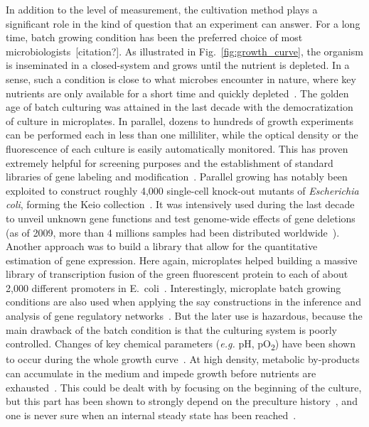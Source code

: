 In addition to the level of measurement, the cultivation method plays a significant role in the kind of question that an experiment can answer.
For a long time, batch growing condition has been the preferred choice of most microbiologists~[citation?].
As illustrated in Fig.~\ref{fig:growth_curve}, the organism is inseminated in a closed-system and grows until the nutrient is depleted.
In a sense, such a condition is close to what microbes encounter in nature, where key nutrients are only available for a short time and quickly depleted~\cite{mcarthur_microbial_2006,menge_nitrogen_2012,hobbie_microbes_2013}.
The golden age of batch culturing was attained in the last decade with the democratization of culture in microplates.
In parallel, dozens to hundreds of growth experiments can be performed each in less than one milliliter, while the optical density or the fluorescence of each culture is easily automatically monitored.
This has proven extremely helpful for screening purposes and the establishment of standard libraries of gene labeling and modification~\cite{baba_construction_2006,zaslaver_comprehensive_2006}.
Parallel growing has notably been exploited to construct roughly 4,000 single-cell knock-out mutants of \textit{Escherichia coli}, forming the Keio collection~\cite{baba_construction_2006}.
It was intensively used during the last decade to unveil unknown gene functions and test genome-wide effects of gene deletions (as of 2009, more than 4 millions samples had been distributed worldwide~\cite{yamamoto_update_2009}).
Another approach was to build a library that allow for the quantitative estimation of gene expression.
Here again, microplates helped building a massive library of transcription fusion of the green fluorescent protein to each of about 2,000 different promoters in E.~coli~\cite{zaslaver_comprehensive_2006}.
Interestingly, microplate batch growing conditions are also used when applying the say constructions in the inference and analysis of gene regulatory networks~\cite{gerosa_dissecting_2013,berthoumieux_shared_2013,keren_promoters_2013,
ronen_assigning_2002,stefan_inference_2015}.
But the later use is hazardous, because the main drawback of the batch condition is that the culturing system is poorly controlled.
Changes of key chemical parameters (\textit{e.g.} pH, pO\textsubscript{2}) have been shown to occur during the whole growth curve~\cite{bekker_changes_2007}.
At high density, metabolic by-products can accumulate in the medium and impede growth before nutrients are exhausted~\cite{ackerman_accumulation_1974,lenski_chemical_2002,luli_comparison_1990}.
This could be dealt with by focusing on the beginning of the culture, but this part has been shown to strongly depend on the preculture history~\cite{ng_damage_1962,dufrenne_effect_1997,shaw_effect_1967}, and one is never sure when an internal steady state has been reached~\cite{myers_culture_1944}.

